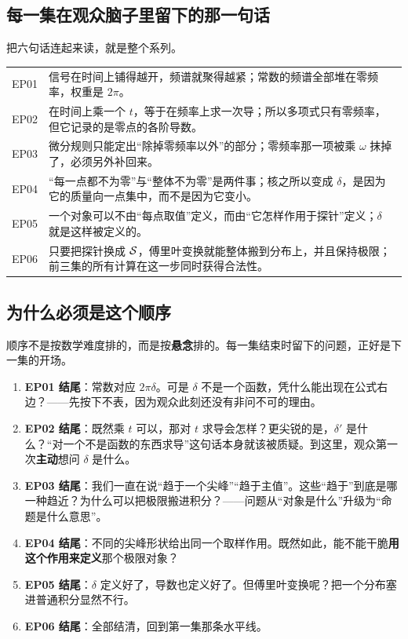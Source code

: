 \subsection*{每一集在观众脑子里留下的那一句话}

把六句话连起来读，就是整个系列。

\begin{center}
\small
\renewcommand{\arraystretch}{1.4}
\begin{tabularx}{\textwidth}{@{}L{1.3cm}Y@{}}
\toprule
EP01 & 信号在时间上铺得越开，频谱就聚得越紧；常数的频谱全部堆在零频率，权重是 $2\pi$。 \\
EP02 & 在时间上乘一个 $t$，等于在频率上求一次导；所以多项式只有零频率，但它记录的是零点的各阶导数。 \\
EP03 & 微分规则只能定出“除掉零频率以外”的部分；零频率那一项被乘 $\omega$ 抹掉了，必须另外补回来。 \\
EP04 & “每一点都不为零”与“整体不为零”是两件事；核之所以变成 $\delta$，是因为它的质量向一点集中，而不是因为它变小。 \\
EP05 & 一个对象可以不由“每点取值”定义，而由“它怎样作用于探针”定义；$\delta$ 就是这样被定义的。 \\
EP06 & 只要把探针换成 $\mathcal{S}$，傅里叶变换就能整体搬到分布上，并且保持极限；前三集的所有计算在这一步同时获得合法性。 \\
\bottomrule
\end{tabularx}
\end{center}

\subsection*{为什么必须是这个顺序}

顺序不是按数学难度排的，而是按\textbf{悬念}排的。每一集结束时留下的问题，正好是下一集的开场。

\begin{enumerate}[leftmargin=2em,itemsep=0.45em]
\item \textbf{EP01 结尾}：常数对应 $2\pi\delta$。可是 $\delta$ 不是一个函数，凭什么能出现在公式右边？——先按下不表，因为观众此刻还没有非问不可的理由。
\item \textbf{EP02 结尾}：既然乘 $t$ 可以，那对 $t$ 求导会怎样？更尖锐的是，$\delta'$ 是什么？“对一个不是函数的东西求导”这句话本身就该被质疑。到这里，观众第一次\textbf{主动}想问 $\delta$ 是什么。
\item \textbf{EP03 结尾}：我们一直在说“趋于一个尖峰”“趋于主值”。这些“趋于”到底是哪一种趋近？为什么可以把极限搬进积分？——问题从“对象是什么”升级为“命题是什么意思”。
\item \textbf{EP04 结尾}：不同的尖峰形状给出同一个取样作用。既然如此，能不能干脆\textbf{用这个作用来定义}那个极限对象？
\item \textbf{EP05 结尾}：$\delta$ 定义好了，导数也定义好了。但傅里叶变换呢？把一个分布塞进普通积分显然不行。
\item \textbf{EP06 结尾}：全部结清，回到第一集那条水平线。
\end{enumerate}

